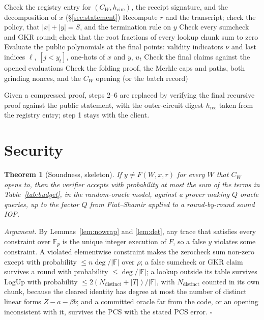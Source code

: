 \documentclass[11pt]{article}
\newcommand{\F}{\mathbb{F}}
\newcommand{\Fp}{\F_p}
\newtheorem{theorem}{Theorem}
\begin{document}
\begin{algorithm}[h]
\caption{\(\mathsf{Verify}\)}
\begin{algorithmic}[1]
\State Check the registry entry for \((C_W, h_{\mathrm{circ}})\), the receipt signature, and the decomposition of \(x\) (\S\ref{sec:statement})
\State Recompute \(r\) and the transcript; check the policy, that \(|x| + |y| = S\), and the termination rule on \(y\)
\State Check every sumcheck and GKR round; check that the root fractions of every lookup chunk sum to zero
\State Evaluate the public polynomials at the final points: validity indicators \(\nu\) and last indices \(\ell\), \([j < y_t]\), one-hots of \(x\) and \(y\), \(u_t\)
\State Check the final claims against the opened evaluations
\State Check the folding proof, the Merkle caps and paths, both grinding nonces, and the \(C_W\) opening (or the batch record)
\end{algorithmic}
\end{algorithm}
\noindent Given a compressed proof, steps 2--6 are replaced by verifying the final recursive proof against the public statement, with the outer-circuit digest \(h_{\mathrm{rec}}\) taken from the registry entry; step 1 stays with the client.

\section{Security}
\label{sec:security}

\begin{theorem}[Soundness, skeleton]
If \(y \ne F(W, x, r)\) for every \(W\) that \(C_W\) opens to, then the verifier accepts with probability at most the sum of the terms in Table~\ref{tab:budget}, in the random-oracle model, against a prover making \(Q\) oracle queries, up to the factor \(Q\) from Fiat--Shamir applied to a round-by-round sound IOP.
\end{theorem}
\noindent\emph{Argument.}
By Lemmas~\ref{lem:nowrap} and \ref{lem:det}, any trace that satisfies every constraint over \(\Fp\) is the unique integer execution of \(F\), so a false \(y\) violates some constraint.
A violated elementwise constraint makes the zerocheck sum non-zero except with probability \(\le n\deg/|\F|\) over \(\rho\); a false sumcheck or GKR claim survives a round with probability \(\le \deg/|\F|\); a lookup outside its table survives LogUp with probability \(\le 2(N_{\mathrm{distinct}} + |T|)/|\F|\), with \(N_{\mathrm{distinct}}\) counted in its own chunk, because the cleared identity has degree at most the number of distinct linear forms \(Z - a - \beta b\); and a committed oracle far from the code, or an opening inconsistent with it, survives the PCS with the stated PCS error. \(\square\)
\end{document}
